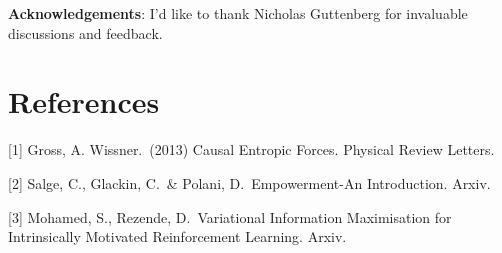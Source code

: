 \documentclass{article}
\begin{document}
\textbf{Acknowledgements}: I'd like to thank Nicholas Guttenberg for invaluable discussions and feedback.

\section*{References}

\small

[1] Gross, A. Wissner.\ (2013) Causal Entropic Forces. Physical Review Letters.

[2] Salge, C., Glackin, C.\ \& Polani, D.\ Empowerment-An Introduction. Arxiv. 

[3] Mohamed, S., Rezende, D.\ Variational Information Maximisation for Intrinsically Motivated Reinforcement Learning. Arxiv. 
\end{document}
